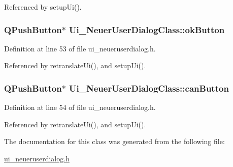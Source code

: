 Referenced by setupUi().\hypertarget{class_ui___neuer_user_dialog_class_fc8242ec3276ed86945abe32fab065e4}{
\subsubsection[okButton]{\setlength{\rightskip}{0pt plus 5cm}QPushButton$\ast$ {\bf Ui\_\-NeuerUserDialogClass::okButton}}}
\label{class_ui___neuer_user_dialog_class_fc8242ec3276ed86945abe32fab065e4}




Definition at line 53 of file ui\_\-neueruserdialog.h.

Referenced by retranslateUi(), and setupUi().\hypertarget{class_ui___neuer_user_dialog_class_e2057c836f8bdd8a3aab3811363cfe9c}{
\subsubsection[canButton]{\setlength{\rightskip}{0pt plus 5cm}QPushButton$\ast$ {\bf Ui\_\-NeuerUserDialogClass::canButton}}}
\label{class_ui___neuer_user_dialog_class_e2057c836f8bdd8a3aab3811363cfe9c}




Definition at line 54 of file ui\_\-neueruserdialog.h.

Referenced by retranslateUi(), and setupUi().

The documentation for this class was generated from the following file:\begin{CompactItemize}
\item 
\hyperlink{ui__neueruserdialog_8h}{ui\_\-neueruserdialog.h}\end{CompactItemize}
